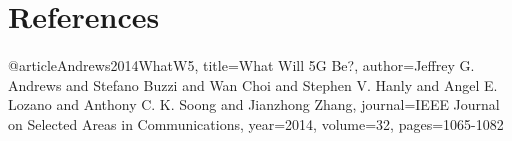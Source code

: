 \section{References}
\paragraph{}

@article{Andrews2014WhatW5,
  title={What Will 5G Be?},
  author={Jeffrey G. Andrews and Stefano Buzzi and Wan Choi and Stephen V. Hanly and Angel E. Lozano and Anthony C. K. Soong and Jianzhong Zhang},
  journal={IEEE Journal on Selected Areas in Communications},
  year={2014},
  volume={32},
  pages={1065-1082}
}